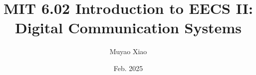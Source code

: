 \documentclass[a4paper]{report}
\title{MIT 6.02 Introduction to EECS II: Digital Communication Systems}
\author{Muyao Xiao}
\date{Feb. 2025}
\begin{document}
\maketitle

\begin{abstract}


\end{abstract}

\tableofcontents


\pagestyle{plain}
\end{document}
